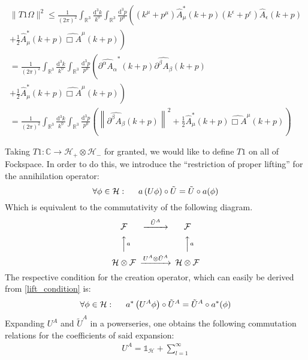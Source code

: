 \documentclass[a4paper,12pt]{article}
\begin{document}
\begin{multline}
\| T1 \Omega\|^2\le \frac{1}{(2\pi)^2}  \int_{\mathbb{R}^3} \frac{\text{d}^3k}{ k^0} \int_{\mathbb{R}^3} \frac{\text{d}^3p}{ p^0}
 \left( (k^\mu+p^\mu) \hat{A}^*_{\mu} (k+p) (k^\epsilon+p^\epsilon)\hat{A}_{\epsilon} (k+p)\right. \\
 \left. +\frac{1}{2} \hat{A}^*_{\mu} (k+p)  \widehat{\Box A}^{\mu} (k+p) \right) \\
 =\frac{1}{(2\pi)^2}  \int_{\mathbb{R}^3} \frac{\text{d}^3k}{ k^0} \int_{\mathbb{R}^3} \frac{\text{d}^3p}{ p^0}
 \left( \widehat{\partial^\alpha A_\alpha}^*(k+p) \widehat{\partial^\beta A_\beta}(k+p)\right. \\
 \left. +\frac{1}{2} \hat{A}^*_{\mu} (k+p)  \widehat{\Box A}^{\mu} (k+p) \right)\\
  =\frac{1}{(2\pi)^2}  \int_{\mathbb{R}^3} \frac{\text{d}^3k}{ k^0} \int_{\mathbb{R}^3} \frac{\text{d}^3p}{ p^0}
 \left(\left\|\widehat{\partial^\beta A_\beta}(k+p)\right\|^2
 +\frac{1}{2} \hat{A}^*_{\mu} (k+p)  \widehat{\Box A}^{\mu} (k+p) \right)
\end{multline}

Taking \(T1 : \mathbb{C} \rightarrow \mathcal{H}_+  \otimes \mathcal{H}_-\) for granted, we would like to define \(T1\) on all of Fockspace. In order to do this, we introduce the ``restriction of proper lifting'' for the annihilation operator:
\begin{equation}\label{lift_condition}
\forall \phi\in \mathcal{H}: \hspace{0.5cm} a\left( U \phi \right)  \circ \tilde{U}=\tilde{U} \circ a(\phi)
\end{equation}
Which is equivalent to the commutativity of the following diagram.
\begin{equation}
\begin{CD}								%
\mathcal{F}     @>\tilde{U}^A>>  \mathcal{F}\\
@AAaA        @AAaA\\
\mathcal{H}\otimes \mathcal{F}     @>U^A\otimes \tilde{U}^A>>  \mathcal{H}\otimes \mathcal{F} 
\end{CD}
\end{equation}
The respective condition for the creation operator, which can easily be derived from \eqref{lift_condition} is:
\begin{equation}
\forall \phi\in \mathcal{H}: \hspace{0.5cm} a^*\left( U^A \phi \right)  \circ \tilde{U}^A=\tilde{U}^A \circ a^*(\phi)
\end{equation}
Expanding \(U^A\) and \(\tilde{U}^A\) in a powerseries, one obtains the following commutation relations for the coefficients of said expansion:
\begin{multline}
U^A=\mathds{1}_\mathcal{H}+\sum_{l=1}^\infty
\end{multline}
\end{document}

